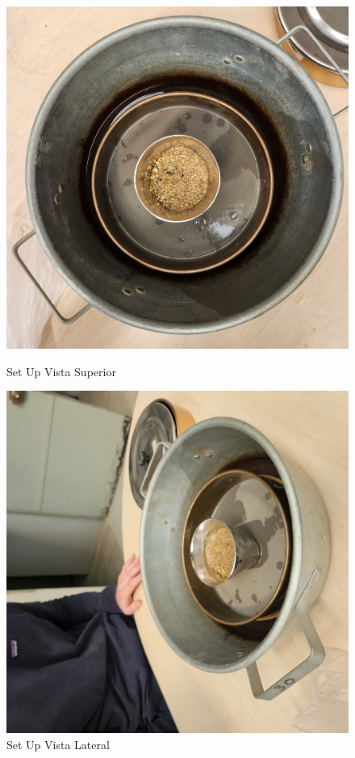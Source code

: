 \begin{figure}[H]
    \centering
    \begin{minipage}{0.4\textwidth}
        \centering
        \includegraphics[angle=-90, width=\textwidth]{FOTOS/cono_1.jpg}
        \caption{Set Up Vista Superior}
    \end{minipage}
    \begin{minipage}{0.4\textwidth}
        \centering
        \includegraphics[angle=-90, width=\textwidth]{FOTOS/cono_2.jpg}
        \caption{Set Up Vista Lateral}
    \end{minipage}
\end{figure}

